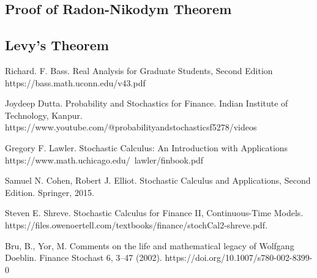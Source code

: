 \documentclass[openany, amssymb, psamsfonts]{amsart}
\theoremstyle{definition}
\numberwithin{equation}{section}
\begin{document}
\subsection{Proof of Radon-Nikodym Theorem}

\subsection{Levy's Theorem}


\begin{thebibliography}{9}

Richard. F. Bass. 
Real Analysis for Graduate Students, Second Edition
https://bass.math.uconn.edu/v43.pdf

Joydeep Dutta.
Probability and Stochastics for Finance.
Indian Institute of Technology, Kanpur.
https://www.youtube.com/@probabilityandstochasticsf5278/videos

Gregory F. Lawler.
Stochastic Calculus: An Introduction with
Applications
https://www.math.uchicago.edu/~lawler/finbook.pdf


Samuel N. Cohen, Robert J. Elliot.
Stochastic Calculus and Applications, Second Edition.
Springer, 2015.

Steven E. Shreve.
Stochastic Calculus for Finance II, Continuous-Time Models.
https://files.owenoertell.com/textbooks/finance/stochCal2-shreve.pdf.

Bru, B., Yor, M. Comments on the life and mathematical legacy of Wolfgang Doeblin. Finance Stochast 6, 3–47 (2002). https://doi.org/10.1007/s780-002-8399-0

\end{thebibliography}
\end{document}
